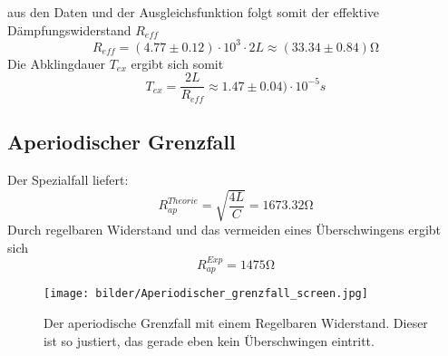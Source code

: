 aus den Daten und der Ausgleichsfunktion folgt somit der effektive Dämpfungswiderstand 
$R_{eff}$
\begin{equation}
    R_{eff}= (4.77 \pm 0.12)\cdot10^3 \cdot 2L \approx (33.34 \pm 0.84) \si{\ohm}
\end{equation}
Die Abklingdauer $T_{ex}$ ergibt sich somit
\begin{equation}
    T_{ex}=\frac{2L}{R_{eff}}\approx 1.47 \pm 0.04) \cdot 10^{-5}s
\end{equation}






\subsection{Aperiodischer Grenzfall}
Der Spezialfall liefert:
\begin{equation}
    R_{ap}^{Theorie}=\sqrt{\frac{4L}{C}}=1673.32\si{\ohm}     %
\end{equation}
Durch regelbaren Widerstand und das vermeiden eines Überschwingens ergibt sich
\begin{equation}
    R_{ap}^{Exp}=1475\si{\ohm}
\end{equation}
\begin{figure}
    \centering
    \texttt{[image: bilder/Aperiodischer\_grenzfall\_screen.jpg]}
    \caption{Der aperiodische Grenzfall mit einem Regelbaren Widerstand. Dieser ist so justiert, das gerade eben kein Überschwingen eintritt.}    %
\end{figure} 
\newpage







